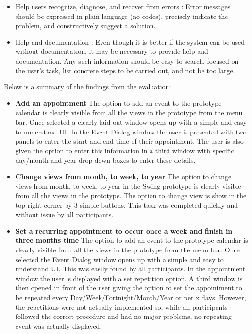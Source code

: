 \documentclass{article}
\begin{document}
\begin{itemize}
\item Help users recognize, diagnose, and recover from errors : Error messages should be expressed in plain language (no codes), precisely indicate the problem, and constructively suggest a solution. 
    
\item Help and documentation : Even though it is better if the system can be used without documentation, it may be necessary to provide help and documentation. Any such information should be easy to search, focused on the user's task, list concrete steps to be carried out, and not be too large.    
\end{itemize}

Below is a summary of the findings from the evaluation:

\begin{itemize}
\item \textbf{Add an appointment}
The option to add an event to the prototype calendar is clearly visible from all the views in the prototype from the menu bar.
Once selected a clearly laid out window opens up with a simple and easy to understand UI. In the Event Dialog window the user is presented with two panels to enter the start and end time of their appointment. The user is also given the option to enter this information in a third window with specific day/month and year drop down boxes to enter these details.
\item \textbf{Change views from month, to week, to year}
The option to change views from month, to week, to year in the Swing prototype is clearly visible from all the views in the prototype. The option to change view is show in the top right corner by 3 simple buttons. This task was
completed quickly and without issue by all participants.
\item \textbf{Set a recurring appointment to occur once a week and finish in three months time}
The option to add an event to the prototype calendar is clearly visible from all the views in the prototype from the menu bar.
Once selected the Event Dialog window opens up with a simple and easy to understand UI. This was easily found by all participants. In the appointment window the user is displayed with a set repetition option. A third window is then opened in front of the user giving the option to set the appointment to be repeated every Day/Week/Fortnight/Month/Year or per x days.
However, the repetitions were not actually implemented so, while all
participants followed the correct procedure and had no major problems,
no repeating event was actually displayed.

\end{itemize}
\end{document}
